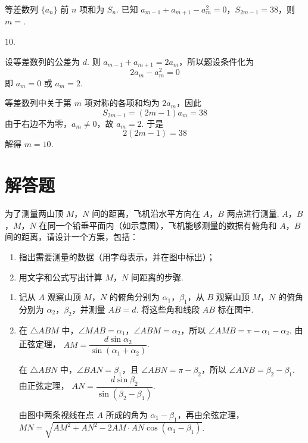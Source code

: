 \begin{problem}
等差数列 \(\{a_{n}\}\) 前 \(n\) 项和为 \(S_{n}\). 已知 \(a_{m-1} + a_{m+1} - a_{m}^{2} = 0\)，\(S_{2m-1} = 38\)，则 \(m =\)\fillinblank{}.
\end{problem}

\begin{answer}
\(10\).
\end{answer}

\begin{solution}
设等差数列的公差为 \(d\). 则
\(a_{m-1}+a_{m+1}=2a_m\)，所以题设条件化为
\[
2a_m-a_m^2=0
\]
即 \(a_m=0\) 或 \(a_m=2\).

等差数列中关于第 \(m\) 项对称的各项和均为 \(2a_m\)，因此
\[
S_{2m-1}=(2m-1)a_m=38
\]
由于右边不为零，\(a_m\neq0\)，故 \(a_m=2\). 于是
\[
2(2m-1)=38
\]
解得 \(m=10\).
\end{solution}

\section{解答题}

\begin{problem}
为了测量两山顶 \(M\)，\(N\) 间的距离，飞机沿水平方向在 \(A\)，\(B\) 两点进行测量. \(A\)，\(B\)，\(M\)，\(N\) 在同一个铅垂平面内（如示意图），飞机能够测量的数据有俯角和 \(A\)，\(B\) 间的距离，请设计一个方案，包括：

\begin{enumerate}
\item 指出需要测量的数据（用字母表示，并在图中标出）；
\item 用文字和公式写出计算 \(M\)，\(N\) 间距离的步骤.
\end{enumerate}

\end{problem}

\begin{solution}
\begin{enumerate}
\item 记从 \(A\) 观察山顶 \(M\)，\(N\) 的俯角分别为 \(\alpha_1\)，\(\beta_1\)，从 \(B\) 观察山顶 \(M\)，\(N\) 的俯角分别为 \(\alpha_2\)，\(\beta_2\)，并测量 \(AB=d\). 将这些角和线段 \(AB\) 标在图中.
\item 在 \(\triangle ABM\) 中，\(\angle MAB=\alpha_1\)，\(\angle ABM=\alpha_2\)，所以 \(\angle AMB=\pi-\alpha_1-\alpha_2\). 由正弦定理，
\(AM=\dfrac{d\sin\alpha_2}{\sin(\alpha_1+\alpha_2)}\).

在 \(\triangle ABN\) 中，\(\angle BAN=\beta_1\)，且 \(\angle ABN=\pi-\beta_2\)，所以 \(\angle ANB=\beta_2-\beta_1\). 由正弦定理，
\(AN=\dfrac{d\sin\beta_2}{\sin(\beta_2-\beta_1)}\).

由图中两条视线在点 \(A\) 所成的角为 \(\alpha_1-\beta_1\)，再由余弦定理，
\(MN=\sqrt{AM^2+AN^2-2AM\cdot AN\cos(\alpha_1-\beta_1)}\).
\end{enumerate}
\end{solution}

